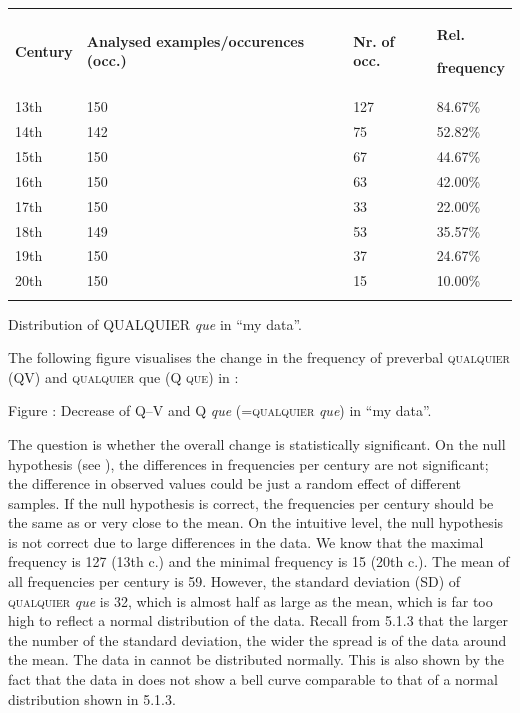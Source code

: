 \begin{table}
\begin{tabularx}{\textwidth}{XXXX}
\lsptoprule
 \textbf{Century} & \textbf{Analysed} \textbf{examples/occurences} \textbf{(occ.)} & \textbf{Nr.} \textbf{of} \textbf{occ.} & { \textbf{Rel.} }

 \textbf{frequency}\\
 13th & 150 & 127 & 84.67\%\\
 14th & 142 & 75 & 52.82\%\\
 15th & 150 & 67 & 44.67\%\\
 16th & 150 & 63 & 42.00\%\\
 17th & 150 & 33 & 22.00\%\\
 18th & 149 & 53 & 35.57\%\\
 19th & 150 & 37 & 24.67\%\\
 20th & 150 & 15 & 10.00\%\\
\lspbottomrule
\end{tabularx}
\caption{\label{tab:} ~}Distribution of QUALQUIER \textit{que} in “my data”.
\end{table}

The following figure visualises the change in the frequency of preverbal \textsc{qualquier} (QV) and \textsc{qualquier} que (\textsc{Q} \textsc{que}) in :

Figure : Decrease of Q–V and Q \textit{que} (=\textsc{qualquier} \textit{que}) in “my data”.

The question is whether the overall change is statistically significant. On the null hypothesis (see ), the differences in frequencies per century are not significant; the difference in observed values could be just a random effect of different samples. If the null hypothesis is correct, the frequencies per century should be the same as or very close to the mean. On the intuitive level, the null hypothesis is not correct due to large differences in the data. We know that the maximal frequency is 127 (13th c.) and the minimal frequency is 15 (20th c.). The mean of all frequencies per century is 59. However, the standard deviation (SD) of \textsc{qualquier} \textit{que} is 32, which is almost half as large as the mean, which is far too high to reflect a normal distribution of the data. Recall from 5.1.3 that the larger the number of the standard deviation, the wider the spread is of the data around the mean. The data in  cannot be distributed normally. This is also shown by the fact that the data in  does not show a bell curve comparable to that of a normal distribution shown in 5.1.3.

